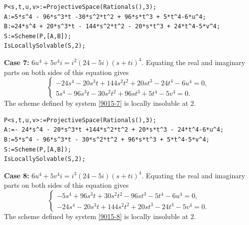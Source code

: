 \documentclass[a4paper,12pt,english,reqno]{amsart}
\begin{document}
\begin{lstlisting}
P<s,t,u,v>:=ProjectiveSpace(Rationals(),3);
A:=5*s^4 - 96*s^3*t -30*s^2*t^2 + 96*s*t^3 + 5*t^4-6*u^4;
B:=24*s^4 + 20*s^3*t - 144*s^2*t^2 - 20*s*t^3 + 24*t^4-5*v^4;
S:=Scheme(P,[A,B]);
IsLocallySolvable(S,2);
\end{lstlisting}

{\bf Case 7:} $6u^4+5v^4i=i^2(24-5i)(s+ti)^4$. Equating the real and imaginary parts on both sides of this equation gives
\begin{equation}\label{9015-7}
\begin{cases}
-24s^4 - 20s^3t + 144s^2t^2 + 20st^3 - 24t^4 - 6u^4=0,\\
5s^4 - 96s^3t - 30s^2t^2 + 96st^3 + 5t^4 - 5v^4=0.
\end{cases}
\end{equation}
The scheme defined by system \eqref{9015-7} is locally insoluble at $2$.

\begin{lstlisting}
P<s,t,u,v>:=ProjectiveSpace(Rationals(),3);
A:=- 24*s^4 - 20*s^3*t +144*s^2*t^2 + 20*s*t^3 - 24*t^4-6*u^4;
B:=5*s^4 - 96*s^3*t - 30*s^2*t^2 + 96*s*t^3 + 5*t^4-5*v^4;
S:=Scheme(P,[A,B]);
IsLocallySolvable(S,2);
\end{lstlisting}


{\bf Case 8:} $6u^4+5v^4i=i^3(24-5i)(s+ti)^4$. Equating the real and imaginary parts on both sides of this equation gives
\begin{equation}\label{9015-8}
\begin{cases}
-5s^4 + 96s^3t + 30s^2t^2 - 96st^3 - 5t^4 - 6u^4=0,\\
-24s^4 - 20s^3t + 144s^2t^2 + 20st^3 - 24t^4 - 5v^4=0.
\end{cases}
\end{equation}
The scheme defined by system \eqref{9015-8} is locally insoluble at $2$.
\end{document}
